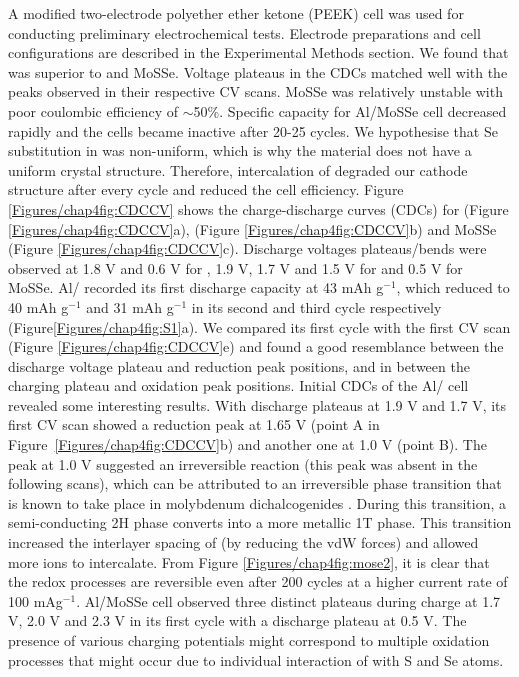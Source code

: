 A modified two-electrode polyether ether ketone (PEEK) cell was used for conducting preliminary electrochemical tests. Electrode preparations and cell configurations are described in the Experimental Methods section. We found that  was superior to  and MoSSe. Voltage plateaus in the CDCs matched well with the peaks observed in their respective CV scans. MoSSe was relatively unstable with poor coulombic efficiency of $\sim$50\%. Specific capacity for Al/MoSSe cell decreased rapidly and the cells became inactive after 20-25 cycles. We hypothesise that Se substitution in  was non-uniform, which is why the material does not have a uniform crystal structure. Therefore, intercalation of  degraded our cathode structure after every cycle and reduced the cell efficiency.
Figure \ref{Figures/chap4fig:CDCCV} shows the charge-discharge curves (CDCs) for  (Figure \ref{Figures/chap4fig:CDCCV}a),  (Figure \ref{Figures/chap4fig:CDCCV}b) and MoSSe (Figure \ref{Figures/chap4fig:CDCCV}c). Discharge voltages plateaus/bends  were observed at 1.8 V and 0.6 V  for , 1.9 V, 1.7 V  and 1.5 V for  and 0.5 V for MoSSe. Al/  recorded its first discharge capacity at 43 mAh g$^{-1}$, which reduced to 40 mAh g$^{-1}$ and 31 mAh g$^{-1}$ in its second and third cycle respectively (Figure\ref{Figures/chap4fig:S1}a). We compared its first cycle with the first CV scan (Figure \ref{Figures/chap4fig:CDCCV}e) and found a good resemblance between the discharge voltage plateau and reduction peak positions, and in between the charging plateau and oxidation peak positions. Initial CDCs of the Al/ cell revealed some interesting results. With discharge plateaus at 1.9 V and 1.7 V, its first CV scan showed a reduction peak at 1.65 V (point A in Figure\ \ref{Figures/chap4fig:CDCCV}b) and another one at 1.0 V (point B). The peak at 1.0 V suggested an irreversible reaction (this peak was absent in the following scans), which can be attributed to an irreversible phase transition that is known to take place in molybdenum dichalcogenides \cite{fan_hybrid_2017}. During this transition, a semi-conducting 2H phase converts into a more metallic 1T phase.  This transition increased the interlayer spacing of  (by reducing the vdW forces) and allowed more  ions to intercalate. From Figure \ref{Figures/chap4fig:mose2}, it is clear that the redox processes are reversible even after 200 cycles  at a higher current rate of 100 mAg$^{-1}$. Al/MoSSe cell observed three distinct plateaus during charge at 1.7 V, 2.0 V and 2.3 V in its first cycle with a discharge plateau at 0.5 V. The presence of various charging potentials might correspond to multiple oxidation processes that might occur due to individual interaction of  with S and Se atoms. 
